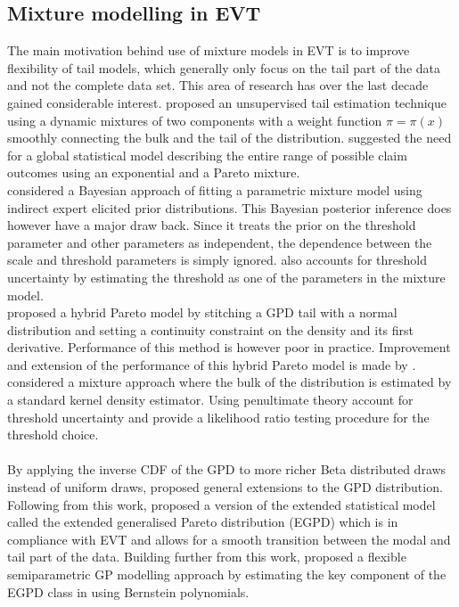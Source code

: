 \subsection{Mixture modelling in EVT}
The main motivation behind use of mixture models in EVT is to improve flexibility of tail models, which generally only focus on the tail part of the data and not the complete data set. This area of research has over the last decade gained considerable interest. \cite{frigessi2002dynamic} proposed an unsupervised tail estimation technique using a dynamic mixtures of two components with a weight function $\pi=\pi(x)$ smoothly connecting the bulk and the tail of the distribution. \cite{sts626} suggested the need for a global statistical model describing the entire range of possible claim outcomes using an exponential and a Pareto mixture.
\\
\cite{behrens2004bayesian} considered a Bayesian approach of fitting a parametric mixture model using indirect expert elicited prior distributions. This Bayesian posterior inference does however have a major draw back. Since it treats the prior on the threshold parameter and other parameters as independent, the dependence between the scale and threshold parameters is simply ignored. \cite{tancredi2006accounting} also accounts for threshold uncertainty by estimating the threshold as one of the parameters in the mixture model. 
\\
\cite{carreau2009hybrid2} proposed a hybrid Pareto model by stitching a GPD tail with a normal distribution and setting a continuity constraint on the density and its first derivative. Performance of this method is however poor in practice. Improvement and extension of the performance of this hybrid Pareto model is made by \cite{carreau2009hybrid1}.
\\
\cite{macdonald2011flexible} considered a mixture approach where the bulk of the distribution is estimated by a standard kernel density estimator. Using penultimate theory \cite{wadsworth2012likelihood} account for threshold uncertainty and provide a likelihood ratio testing procedure for the threshold choice.
\\\\
By applying the inverse CDF of the GPD to more richer Beta distributed draws instead of uniform draws, \cite{papastathopoulos2013extended} proposed general extensions to the GPD distribution. Following from this work, \cite{naveau2016modeling} proposed a version of the extended statistical model called the extended generalised Pareto distribution (EGPD) which is in compliance with EVT and allows for a smooth transition between the modal and tail part of the data. Building further from this work, \cite{tencaliec2018flexible} proposed a flexible semiparametric GP modelling approach by estimating the key component of the EGPD class in \cite{naveau2016modeling} using Bernstein polynomials.

